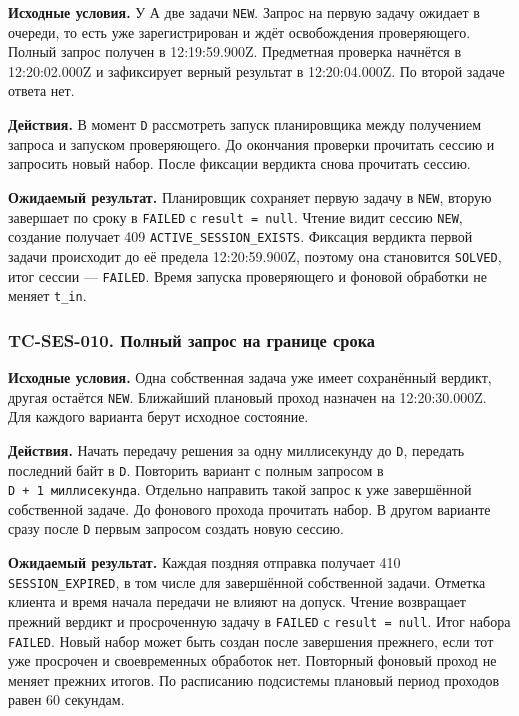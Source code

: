 \documentclass[12pt,a4paper]{article}
\begin{document}
\hypertarget{tc-ses-009-своевременный-ответ-в-очереди-во-время-просрочки}{}

\hypertarget{tc-ses-009}{}

\textbf{Исходные условия.} У А две задачи \texttt{NEW}. Запрос на первую задачу ожидает в очереди, то есть уже зарегистрирован и ждёт освобождения проверяющего. Полный запрос получен в 12:19:59.900Z. Предметная проверка начнётся в 12:20:02.000Z и зафиксирует верный результат в 12:20:04.000Z. По второй задаче ответа нет.

\textbf{Действия.} В момент \texttt{D} рассмотреть запуск планировщика между получением запроса и запуском проверяющего. До окончания проверки прочитать сессию и запросить новый набор. После фиксации вердикта снова прочитать сессию.

\textbf{Ожидаемый результат.} Планировщик сохраняет первую задачу в \texttt{NEW}, вторую завершает по сроку в \texttt{FAILED} с \texttt{result\ =\ null}. Чтение видит сессию \texttt{NEW}, создание получает 409 \texttt{ACTIVE\_\allowbreak{}SESSION\_\allowbreak{}EXISTS}. Фиксация вердикта первой задачи происходит до её предела 12:20:59.900Z, поэтому она становится \texttt{SOLVED}, итог сессии --- \texttt{FAILED}. Время запуска проверяющего и фоновой обработки не меняет \texttt{t\_in}.

\subsubsection{TC-SES-010. Полный запрос на границе срока}\label{tc-ses-010-ux43fux43eux43bux43dux44bux439-ux437ux430ux43fux440ux43eux441-ux43dux430-ux433ux440ux430ux43dux438ux446ux435-ux441ux440ux43eux43aux430}

\hypertarget{tc-ses-010-полный-запрос-на-границе-срока}{}

\hypertarget{tc-ses-010}{}

\textbf{Исходные условия.} Одна собственная задача уже имеет сохранённый вердикт, другая остаётся \texttt{NEW}. Ближайший плановый проход назначен на 12:20:30.000Z. Для каждого варианта берут исходное состояние.

\textbf{Действия.} Начать передачу решения за одну миллисекунду до \texttt{D}, передать последний байт в \texttt{D}. Повторить вариант с полным запросом в \texttt{D\ +\ 1\ миллисекунда}. Отдельно направить такой запрос к уже завершённой собственной задаче. До фонового прохода прочитать набор. В другом варианте сразу после \texttt{D} первым запросом создать новую сессию.

\textbf{Ожидаемый результат.} Каждая поздняя отправка получает 410 \texttt{SESSION\_\allowbreak{}EXPIRED}, в том числе для завершённой собственной задачи. Отметка клиента и время начала передачи не влияют на допуск. Чтение возвращает прежний вердикт и просроченную задачу в \texttt{FAILED} с \texttt{result\ =\ null}. Итог набора \texttt{FAILED}. Новый набор может быть создан после завершения прежнего, если тот уже просрочен и своевременных обработок нет. Повторный фоновый проход не меняет прежних итогов. По расписанию подсистемы плановый период проходов равен 60 секундам.
\end{document}
